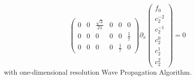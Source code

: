 \begin{frame}
\begin{enumerate}
$$\begin{pmatrix}
			0 & 0 & \frac{\sqrt{3}}{21} & 0 & 0 & 0 \\
			0 & 0 & 0 & 0 & 0 & \frac{1}{7}\\
			0 & 0 & 0 & 0 & \frac{1}{7} & 0
		\end{pmatrix} \partial_x \left(\begin{array}{c}
			f_0 \\
			c_2^{-2} \\
			c_2^{-1} \\
			c_2^0 \\
			c_2^1 \\
			c_2^2
		\end{array}\right) = 0
		$$
		with one-dimensional resolution Wave Propagation Algorithm.
	\end{enumerate}
\end{frame}

